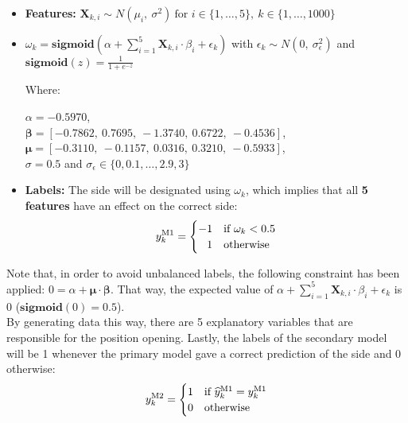 \documentclass[a4paper]{report}
\begin{document}
\begin{itemize}
	\item \textbf{Features:} $\textbf{X}_{k,i} \sim 
	N(\mu_i,\ \sigma^2)\ \text{for } i \in \{1, \ldots, 5\},\ 
	k \in \{1, \ldots, 1000\}$
	
	\item $\omega_k = \textbf{sigmoid} \left( \alpha + 
	\sum_{i = 1}^{5} \textbf{X}_{k,i} \cdot \beta_i + \epsilon_k 
	\right)$ with $\epsilon_k \sim N(0,\ \sigma_{\epsilon}^2)$ and 
	$\textbf{sigmoid}(z) = \frac{1}{1 + e^{-z}}$
	
	\vspace{.1cm}

	Where:
	
	\vspace{.1cm}
	
	$\alpha = -0.5970$, \\
	$\mathbold{\beta}=[-0.7862,\ 0.7695,\ -1.3740,\  0.6722,\ -0.4536]$,\\
	$\mathbold{\mu} = [-0.3110,\ -0.1157,\ 0.0316,\ 0.3210,\ -0.5933]$,\\
	$\sigma = 0.5$ and $\sigma_\epsilon \in \{0, 0.1, \ldots, 2.9, 3\}$\\
	
	\item \textbf{Labels:} The side will be designated using 	$\omega_k$, 
	which implies that all \textbf{5 features} have an effect on the correct 
	side:
	\begin{equation*}
		y_k^{\text{M1}} =
	    \begin{cases}
	      -1 & \text{if } \omega_k < 0.5 \\
	      \hfill 1 & \text{otherwise} 
	    \end{cases}
	\end{equation*}
\end{itemize}

Note that, in order to avoid unbalanced labels, the following constraint has 
been applied: $0 = \alpha + \mathbold{\mu \cdot \beta}$. That way, the 
expected value of $\alpha + \sum_{i = 1}^{5} \textbf{X}_{k,i} \cdot \beta_i 
+ \epsilon_k$ is 0 ($\textbf{sigmoid}(0) = 0.5$).\\

By generating data this way, there are 5 explanatory variables that are 
responsible for the position opening. Lastly, the labels of the secondary 
model will be 1 whenever the primary model gave a correct prediction of the 
side and 0 otherwise:
\begin{equation*}
	y_k^{\text{M2}} =
    \begin{cases}
      1 & \text{if}\ \widehat{y}_k^{\text{M1}} = 
      y_k^{\text{M1}}\\
      \hfill 0 & \text{otherwise} 
    \end{cases}
\end{equation*}
\end{document}
